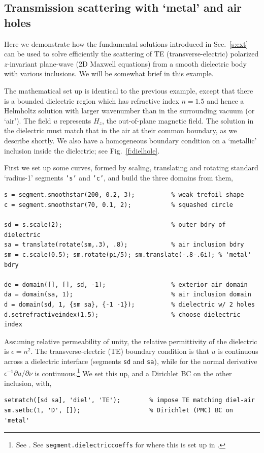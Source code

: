 \subsection{Transmission scattering with `metal' and air holes}
\label{s:dielhole}

Here we demonstrate how the fundamental solutions introduced in
Sec.~\ref{s:ext} can be used to solve efficiently
the scattering of TE (transverse-electric) polarized $z$-invariant
plane-wave (2D Maxwell equations) from a smooth dielectric body with various
inclusions. We will be somewhat brief in this example.

The mathematical set up is identical to the previous example, except that
there is a bounded dielectric region which has refractive index $n = 1.5$ and
hence a Helmholtz solution with
larger wavenumber than in the surrounding vacuum (or `air').
The field $u$ represents $H_z$, the out-of-plane magnetic field.
The solution in the dielectric must match that in the air at their common
boundary, as we describe shortly. We also have a homogeneous boundary condition
on a `metallic' inclusion inside the dielectric; see Fig.~\ref{f:dielhole}.

First we set up some curves, formed by scaling, translating and rotating
standard `radius-1' segments {\tt 's'} and {\tt 'c'}, and build the
three domains from them,
\begin{verbatim}
s = segment.smoothstar(200, 0.2, 3);          % weak trefoil shape
c = segment.smoothstar(70, 0.1, 2);           % squashed circle

sd = s.scale(2);                              % outer bdry of dielectric
sa = translate(rotate(sm,.3), .8);            % air inclusion bdry
sm = c.scale(0.5); sm.rotate(pi/5); sm.translate(-.8-.6i); % 'metal' bdry

de = domain([], [], sd, -1);                  % exterior air domain
da = domain(sa, 1);                           % air inclusion domain
d = domain(sd, 1, {sm sa}, {-1 -1});          % dielectric w/ 2 holes
d.setrefractiveindex(1.5);                    % choose dielectric index
\end{verbatim}

Assuming relative permeability of unity, the relative
permittivity of the dielectric is $\epsilon = n^2$.
The transverse-electric (TE) boundary condition is that $u$ is continuous
across a dielectric interface (segments {\tt sd} and {\tt sa}),
while for the normal derivative $\epsilon^{-1} \partial u/\partial \nu$ is
continuous.\footnote{See \cite{jackson}.
See {\tt segment.dielectriccoeffs} for where this
is set up in \mpspack.}
We set this up, and a Dirichlet BC on the other inclusion, with,
\begin{verbatim}
setmatch([sd sa], 'diel', 'TE');        % impose TE matching diel-air
sm.setbc(1, 'D', []);                   % Dirichlet (PMC) BC on 'metal'
\end{verbatim}

